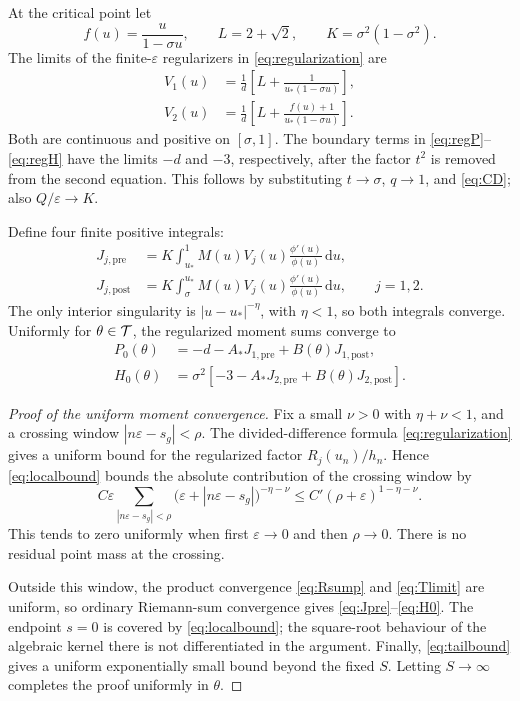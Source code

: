 \documentclass[11pt]{article}
\theoremstyle{definition}
\theoremstyle{remark}
\newcommand{\eps}{\varepsilon}
\newcommand{\dd}{\mathrm d}
\begin{document}
At the critical point let
\[
  f(u)=\frac{u}{1-\sigma u},\qquad
  L=2+\sqrt2,\qquad
  K=\sigma^2(1-\sigma^2).
\]
The limits of the finite-\(\eps\) regularizers in
\eqref{eq:regularization} are
\[
\begin{aligned}
 V_1(u)
  &=\frac1d\left[
       L+\frac1{u_*(1-\sigma u)}
     \right],\\
 V_2(u)
  &=\frac1d\left[
       L+\frac{f(u)+1}{u_*(1-\sigma u)}
     \right].
\end{aligned}
\]
Both are continuous and positive on \([\sigma,1]\).  The boundary terms in
\eqref{eq:regP}--\eqref{eq:regH} have the limits \(-d\) and \(-3\),
respectively, after the factor \(t^2\) is removed from the second equation.
This follows by substituting \(t\to\sigma\), \(q\to1\), and
\eqref{eq:CD}; also \(Q/\eps\to K\).

Define four finite positive integrals:
\begin{align}
 J_{j,\mathrm{pre}}
  &=K\int_{u_*}^{1}
     M(u)V_j(u)\frac{\phi'(u)}{\phi(u)}\,\dd u,              \label{eq:Jpre}\\
 J_{j,\mathrm{post}}
  &=K\int_{\sigma}^{u_*}
     M(u)V_j(u)\frac{\phi'(u)}{\phi(u)}\,\dd u,
 \qquad j=1,2.                                              \label{eq:Jpost}
\end{align}
The only interior singularity is
\(|u-u_*|^{-\eta}\), with \(\eta<1\), so both integrals converge.
Uniformly for \(\theta\in{\cal T}\), the regularized moment sums converge to
\begin{align}
 P_0(\theta)
  &=-d-A_*J_{1,\mathrm{pre}}
     +B(\theta)J_{1,\mathrm{post}},                         \label{eq:P0}\\
 H_0(\theta)
  &=\sigma^2\left[
       -3-A_*J_{2,\mathrm{pre}}
       +B(\theta)J_{2,\mathrm{post}}
     \right].                                                \label{eq:H0}
\end{align}

\begin{proof}[Proof of the uniform moment convergence]
Fix a small \(\nu>0\) with \(\eta+\nu<1\), and a crossing window
\(|n\eps-s_g|<\rho\).  The divided-difference formula
\eqref{eq:regularization} gives a uniform bound for the regularized factor
\(R_j(u_n)/h_n\).  Hence \eqref{eq:localbound} bounds the absolute
contribution of the crossing window by
\[
 C\eps\sum_{|n\eps-s_g|<\rho}
 \bigl(\eps+|n\eps-s_g|\bigr)^{-\eta-\nu}
 \leq C'(\rho+\eps)^{1-\eta-\nu}.
\]
This tends to zero uniformly when first \(\eps\to0\) and then
\(\rho\to0\).  There is no residual point mass at the crossing.

Outside this window, the product convergence
\eqref{eq:Rsump} and \eqref{eq:Tlimit} are uniform, so ordinary Riemann-sum
convergence gives \eqref{eq:Jpre}--\eqref{eq:H0}.  The endpoint \(s=0\)
is covered by \eqref{eq:localbound}; the square-root behaviour of the
algebraic kernel there is not differentiated in the argument.  Finally,
\eqref{eq:tailbound} gives a uniform exponentially small bound beyond the
fixed \(S\).  Letting \(S\to\infty\) completes the proof uniformly in
\(\theta\).
\end{proof}
\end{document}
